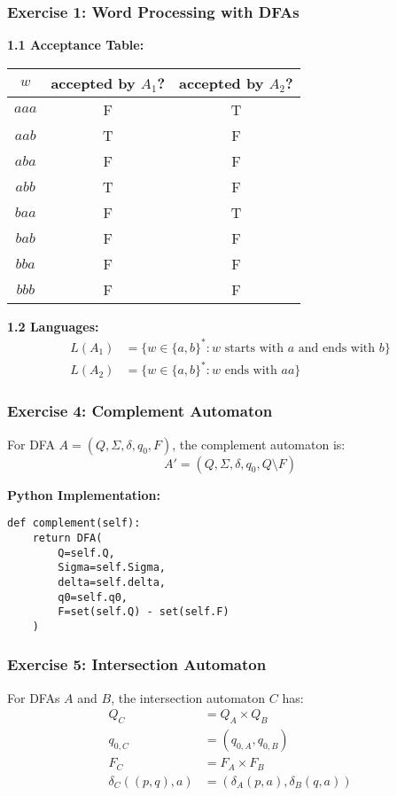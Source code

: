 \documentclass{article}
\begin{document}
\subsubsection{Exercise 1: Word Processing with DFAs}

\textbf{1.1 Acceptance Table:}
\begin{center}
\begin{tabular}{c|cc}
$w$ & accepted by $A_1$? & accepted by $A_2$? \\
\hline
$aaa$ & F & T \\
$aab$ & T & F \\
$aba$ & F & F \\
$abb$ & T & F \\
$baa$ & F & T \\
$bab$ & F & F \\
$bba$ & F & F \\
$bbb$ & F & F \\
\end{tabular}
\end{center}

\textbf{1.2 Languages:}
\begin{align*}
L(A_1) &= \{w\in\{a,b\}^* : w \text{ starts with } a \text{ and ends with } b\} \\
L(A_2) &= \{w\in\{a,b\}^* : w \text{ ends with } aa\}
\end{align*}

\subsubsection{Exercise 4: Complement Automaton}

For DFA $A=(Q,\Sigma,\delta,q_0,F)$, the complement automaton is:
$$A' = (Q,\Sigma,\delta,q_0,Q\setminus F)$$

\textbf{Python Implementation:}
\begin{verbatim}
def complement(self):
    return DFA(
        Q=self.Q, 
        Sigma=self.Sigma,
        delta=self.delta, 
        q0=self.q0,
        F=set(self.Q) - set(self.F)
    )
\end{verbatim}

\subsubsection{Exercise 5: Intersection Automaton}

For DFAs $A$ and $B$, the intersection automaton $C$ has:
\begin{align*}
Q_C &= Q_A \times Q_B \\
q_{0,C} &= (q_{0,A}, q_{0,B}) \\
F_C &= F_A \times F_B \\
\delta_C((p,q),a) &= (\delta_A(p,a), \delta_B(q,a))
\end{align*}
\end{document}
